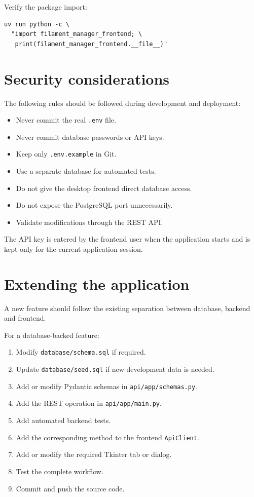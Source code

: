 \documentclass[a4paper,11pt]{article}
\begin{document}
Verify the package import:

\begin{lstlisting}
uv run python -c \
  "import filament_manager_frontend; \
   print(filament_manager_frontend.__file__)"
\end{lstlisting}

\section{Security considerations}

The following rules should be followed during development and deployment:

\begin{itemize}
  \item Never commit the real \texttt{.env} file.
  \item Never commit database passwords or API keys.
  \item Keep only \texttt{.env.example} in Git.
  \item Use a separate database for automated tests.
  \item Do not give the desktop frontend direct database access.
  \item Do not expose the PostgreSQL port unnecessarily.
  \item Validate modifications through the REST API.
\end{itemize}

The API key is entered by the frontend user when the application starts and
is kept only for the current application session.

\section{Extending the application}

A new feature should follow the existing separation between database,
backend and frontend.

For a database-backed feature:

\begin{enumerate}
  \item Modify \texttt{database/schema.sql} if required.
  \item Update \texttt{database/seed.sql} if new development data is needed.
  \item Add or modify Pydantic schemas in
        \texttt{api/app/schemas.py}.
  \item Add the REST operation in \texttt{api/app/main.py}.
  \item Add automated backend tests.
  \item Add the corresponding method to the frontend
        \texttt{ApiClient}.
  \item Add or modify the required Tkinter tab or dialog.
  \item Test the complete workflow.
  \item Commit and push the source code.
\end{enumerate}
\end{document}
